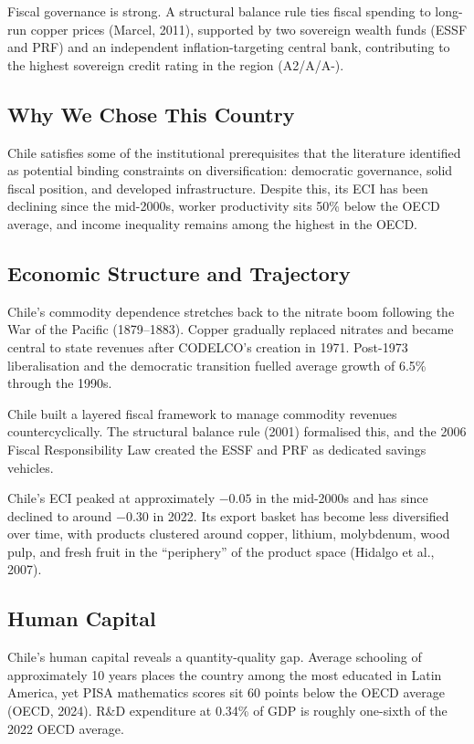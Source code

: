\documentclass[12pt,a4paper]{report}
\begin{document}
Fiscal governance is strong. A structural balance rule ties fiscal spending to long-run copper prices (Marcel, 2011), supported by two sovereign wealth funds (ESSF and PRF) and an independent inflation-targeting central bank, contributing to the highest sovereign credit rating in the region (A2/A/A-).

\subsection{Why We Chose This Country}

Chile satisfies some of the institutional prerequisites that the literature identified as potential binding constraints on diversification: democratic governance, solid fiscal position, and developed infrastructure. Despite this, its ECI has been declining since the mid-2000s, worker productivity sits 50\% below the OECD average, and income inequality remains among the highest in the OECD.

\subsection{Economic Structure and Trajectory}

Chile's commodity dependence stretches back to the nitrate boom following the War of the Pacific (1879--1883). Copper gradually replaced nitrates and became central to state revenues after CODELCO's creation in 1971. Post-1973 liberalisation and the democratic transition fuelled average growth of 6.5\% through the 1990s.

Chile built a layered fiscal framework to manage commodity revenues countercyclically. The structural balance rule (2001) formalised this, and the 2006 Fiscal Responsibility Law created the ESSF and PRF as dedicated savings vehicles.

Chile's ECI peaked at approximately $-0.05$ in the mid-2000s and has since declined to around $-0.30$ in 2022. Its export basket has become less diversified over time, with products clustered around copper, lithium, molybdenum, wood pulp, and fresh fruit in the ``periphery'' of the product space (Hidalgo et al., 2007).

\subsection{Human Capital}

Chile's human capital reveals a quantity-quality gap. Average schooling of approximately 10 years places the country among the most educated in Latin America, yet PISA mathematics scores sit 60 points below the OECD average (OECD, 2024). R\&D expenditure at 0.34\% of GDP is roughly one-sixth of the 2022 OECD average.
\end{document}
